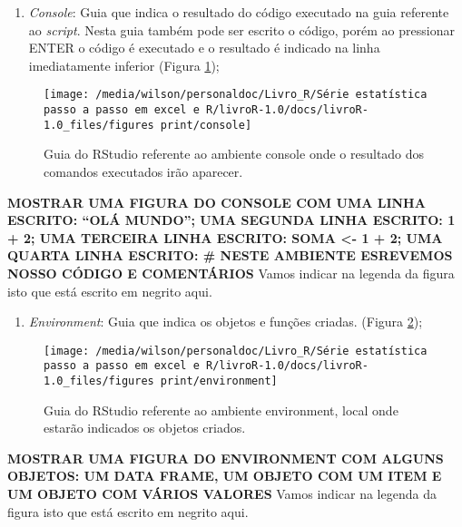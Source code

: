 \documentclass[titlepage, oneside, openany, a4paper]{book}
\providecommand{\tightlist}{%
  \setlength{\itemsep}{0pt}\setlength{\parskip}{0pt}}
\begin{document}
\begin{enumerate}
\def\labelenumi{\arabic{enumi}.}
\setcounter{enumi}{1}
\tightlist
\item
  \emph{Console}: Guia que indica o resultado do código executado na guia referente ao \emph{script}. Nesta guia também pode ser escrito o código, porém ao pressionar ENTER o código é executado e o resultado é indicado na linha imediatamente inferior (Figura \ref{fig:console});
\end{enumerate}

\begin{figure}

{\centering \texttt{[image: /media/wilson/personaldoc/Livro\_R/Série estatística passo a passo em excel e R/livroR-1.0/docs/livroR-1.0\_files/figures print/console]} 

}

\caption{Guia do RStudio referente ao ambiente console onde o resultado dos comandos executados irão aparecer.}\label{fig:console}
\end{figure}

\textbf{MOSTRAR UMA FIGURA DO CONSOLE COM UMA LINHA ESCRITO: ``OLÁ MUNDO''; UMA SEGUNDA LINHA ESCRITO: 1 + 2; UMA TERCEIRA LINHA ESCRITO: SOMA \textless{}- 1 + 2; UMA QUARTA LINHA ESCRITO: \# NESTE AMBIENTE ESREVEMOS NOSSO CÓDIGO E COMENTÁRIOS} Vamos indicar na legenda da figura isto que está escrito em negrito aqui.

\begin{enumerate}
\def\labelenumi{\arabic{enumi}.}
\setcounter{enumi}{2}
\tightlist
\item
  \emph{Environment}: Guia que indica os objetos e funções criadas. (Figura \ref{fig:environment});
\end{enumerate}

\begin{figure}

{\centering \texttt{[image: /media/wilson/personaldoc/Livro\_R/Série estatística passo a passo em excel e R/livroR-1.0/docs/livroR-1.0\_files/figures print/environment]} 

}

\caption{Guia do RStudio referente ao ambiente environment, local onde estarão indicados os objetos criados.}\label{fig:environment}
\end{figure}

\textbf{MOSTRAR UMA FIGURA DO ENVIRONMENT COM ALGUNS OBJETOS: UM DATA FRAME, UM OBJETO COM UM ITEM E UM OBJETO COM VÁRIOS VALORES} Vamos indicar na legenda da figura isto que está escrito em negrito aqui.
\end{document}
